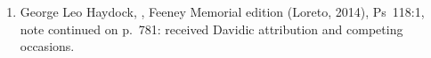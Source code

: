 \begin{enumerate}
\item George Leo Haydock, , Feeney Memorial edition (Loreto, 2014), Ps~118:1, note continued on p.~781: received Davidic attribution and competing occasions.
\end{enumerate}
\endgroup

